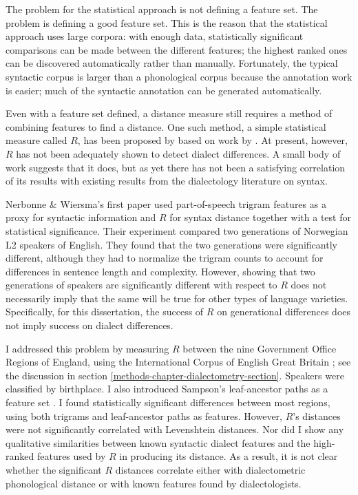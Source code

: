 The problem for the statistical approach is not defining a feature
set. The problem is defining a good feature set. This is the reason
that the statistical approach uses large corpora: with enough data,
statistically significant comparisons can be made between the
different features; the highest ranked ones can be discovered
automatically rather than manually.  Fortunately, the typical syntactic corpus
is larger than a phonological corpus because the annotation
work is easier; much of the syntactic annotation can be generated
automatically.

Even with a feature set defined, a distance measure still requires a
method of combining features to find a distance. One such method, a
simple statistical measure called $R$, has been proposed by
 based on work by . At
present, however, $R$ has not been adequately shown to detect dialect
differences. A small body of work suggests that it does, but as yet
there has not been a satisfying correlation of its results with
existing results from the dialectology literature on syntax.

Nerbonne \& Wiersma's first paper used part-of-speech trigram features
as a proxy for syntactic information and $R$ for syntax distance
together with a test for statistical significance\cite{nerbonne06}.
Their experiment compared two generations of Norwegian L2 speakers of
English.  They found that the two generations were significantly
different, although they had to normalize the trigram counts to
account for differences in sentence length and complexity. However,
showing that two generations of speakers are significantly different
with respect to $R$ does not necessarily imply that the same will be
true for other types of language varieties. Specifically, for this
dissertation, the success of $R$ on generational differences does not
imply success on dialect differences.

I addressed this problem \cite{sanders08b} by measuring $R$ between
the nine Government Office Regions of England, using the International
Corpus of English Great Britain \cite{nelson02}; see the discussion in
section \ref{methods-chapter-dialectometry-section}. Speakers were
classified by birthplace. I also introduced Sampson's leaf-ancestor
paths as a feature set \cite{sampson00}. I found statistically
significant differences between most regions, using both trigrams and
leaf-ancestor paths as features. However, $R$'s distances were not
significantly correlated with Levenshtein distances. Nor did I show
any qualitative similarities between known syntactic dialect features
and the high-ranked features used by $R$ in producing its distance. As
a result, it is not clear whether the significant $R$ distances
correlate either with dialectometric phonological distance or with known
features found by dialectologists.

